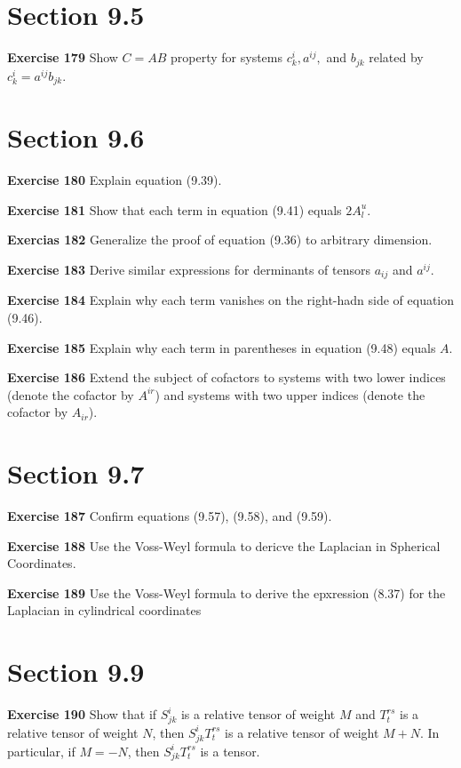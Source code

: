 \documentclass[12pt,a4paper]{report}
\begin{document}
\begin{description}
\section{Section 9.5}
\item \textbf{Exercise 179} Show $C=AB$ property for systems $c_k^i, a^{ij},$ and $b_{jk}$ related by $c_k^i=a^{ij}b_{jk}$.

\section{Section 9.6}
\item \textbf{Exercise 180} Explain equation (9.39).
\item \textbf{Exercise 181} Show that each term in equation (9.41) equals $2A_l^u$.
\item \textbf{Exercias 182} Generalize the proof of equation (9.36) to arbitrary dimension.
\item \textbf{Exercise 183} Derive similar expressions for derminants of tensors $a_{ij}$ and $a^{ij}$.
\item \textbf{Exercise 184} Explain why each term vanishes on the right-hadn side of equation (9.46).
\item \textbf{Exercise 185} Explain why each term in parentheses in equation (9.48) equals $A$.
\item \textbf{Exercise 186} Extend the subject of cofactors to systems with two lower indices (denote the cofactor by $A^{ir}$) and systems with two upper indices (denote the cofactor by $A_{ir}$).

\section{Section 9.7}
\item \textbf{Exercise 187} Confirm equations (9.57), (9.58), and (9.59).
\item \textbf{Exercise 188} Use the Voss-Weyl formula to dericve the Laplacian in Spherical Coordinates.
\item \textbf{Exercise 189} Use the Voss-Weyl formula to derive the epxression (8.37) for the Laplacian in cylindrical coordinates

\section{Section 9.9}
\item \textbf{Exercise 190} Show that if $S_{jk}^i$ is a relative tensor of weight $M$ and $T_t^{rs}$ is a relative tensor of weight $N$, then $S_{jk}^iT_t^{rs}$ is a relative tensor of weight $M + N$.  In particular, if $M=-N$, then $S_{jk}^iT_t^{rs}$ is a tensor.


\end{description}
\end{document}
